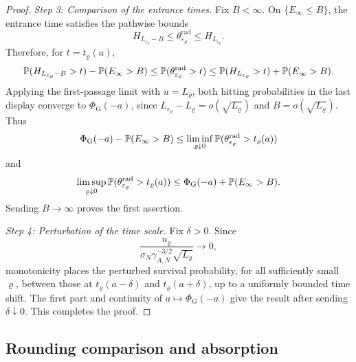 \documentclass[11pt,reqno,a4paper]{article}
\newcommand{\Pp}{\P}
\begin{document}
\begin{proof}
  \emph{Step 3: Comparison of the entrance times.}
  Fix $B<\infty$. On $\{E_\infty\leq B\}$, the entrance time satisfies the
  pathwise bounds
  \begin{equation}\label{eq:rounded-gaussian-hitting-bounds}
    H_{L_{\varepsilon_\varrho}-B}
    \leq
    \theta_{\varepsilon_\varrho}^{\mathrm{rad}}
    \leq
    H_{L_{\varepsilon_\varrho}}.
  \end{equation}
  Therefore, for $t=t_\varrho(a)$,
  \begin{equation*}
    \Pp(H_{L_{\varepsilon_\varrho}-B}>t)-\Pp(E_\infty>B)
    \leq
    \Pp(\theta_{\varepsilon_\varrho}^{\mathrm{rad}}>t)
    \leq
    \Pp(H_{L_{\varepsilon_\varrho}}>t)+\Pp(E_\infty>B).
  \end{equation*}
  Applying the first-passage limit with $u=L_\varrho$, both hitting
  probabilities in the last display converge to $\Phi_{\mathrm G}(-a)$, since
  $L_{\varepsilon_\varrho}-L_\varrho=o(\sqrt{L_\varrho})$ and
  $B=o(\sqrt{L_\varrho})$.
  Thus
  \begin{equation*}
    \Phi_{\mathrm G}(-a)-\Pp(E_\infty>B)
    \leq
    \liminf_{\varrho\downarrow0}
    \Pp(\theta_{\varepsilon_\varrho}^{\mathrm{rad}}>t_\varrho(a))
  \end{equation*}
  and
  \begin{equation*}
    \limsup_{\varrho\downarrow0}
    \Pp(\theta_{\varepsilon_\varrho}^{\mathrm{rad}}>t_\varrho(a))
    \leq
    \Phi_{\mathrm G}(-a)+\Pp(E_\infty>B).
  \end{equation*}
  Sending $B\to\infty$ proves the first assertion.

  \emph{Step 4: Perturbation of the time scale.}
  Fix $\delta>0$. Since
  \begin{equation*}
    \frac{u_\varrho}
    {\sigma_N\gamma_{A,N}^{-3/2}\sqrt{L_\varrho}}
    \longrightarrow0,
  \end{equation*}
  monotonicity places the perturbed survival probability, for all sufficiently
  small $\varrho$, between those at $t_\varrho(a-\delta)$ and
  $t_\varrho(a+\delta)$, up to a uniformly bounded time shift. The first part
  and continuity of $a\mapsto\Phi_{\mathrm G}(-a)$ give the result after
  sending $\delta\downarrow0$. This completes the proof.
\end{proof}

\subsection{Rounding comparison and absorption}
\label{subsec:rounded-gaussian-comparison-absorption}
\end{document}
